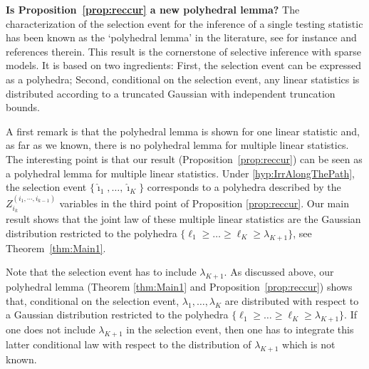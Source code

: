 \documentclass[final,numbib]{imaiai}%
\numberwithin{equation}{section}
\renewcommand{\hat}{\widehat}
\newcommand{\<}{\langle}
\renewcommand{\>}{\rangle}
\newcommand{\1}{\mathds{1}}
\begin{document}
{\begin{remark} 
{\bf Is Proposition~\ref{prop:reccur} a new polyhedral lemma?}
The characterization of the selection event for the inference of a single testing statistic has been known as the ‘polyhedral lemma' in the literature, see for instance \cite[Figure~6.9]{hastie2015statistical} and references therein. This result is the cornerstone of selective inference with sparse models. It is based on two ingredients: First, the selection event can be expressed as a polyhedra; Second, conditional on the selection event, any linear statistics is distributed according to a truncated Gaussian with independent truncation bounds. 

A first remark is that the polyhedral lemma is shown for one linear statistic and, as far as we known, there is no polyhedral lemma for multiple linear statistics. The interesting point is that our result (Proposition~\ref{prop:reccur}) can be seen as a polyhedral lemma for multiple linear statistics. Under \eqref{hyp:IrrAlongThePath}, the selection event $\{\hat \imath_1,\ldots, \hat \imath_K\}$ corresponds to a polyhedra described by the $Z_{i_k}^{(i_1,\cdots, i_{k-1})}$ variables in the third point of Proposition \ref{prop:reccur}. Our main result shows that the joint law of these multiple linear statistics are the Gaussian distribution restricted to the polyhedra $\{\ell_1\geq\ldots\geq \ell_K\geq\lambda_{K+1}\}$, see Theorem~\ref{thm:Main1}.

Note that the selection event has to include $\lambda_{K+1}$. As discussed above, our polyhedral lemma (Theorem \ref{thm:Main1} and Proposition~\ref{prop:reccur}) shows that, conditional on the selection event, $\lambda_1,\ldots,\lambda_K$ are distributed with respect to a Gaussian distribution restricted to the polyhedra $\{\ell_1\geq\ldots\geq \ell_K\geq\lambda_{K+1}\}$. If one does not include $\lambda_{K+1}$ in the selection event, then one has to integrate this latter conditional law with respect to the distribution of $\lambda_{K+1}$ which is not known. 
\end{remark}


\medskip

}
\end{document}
